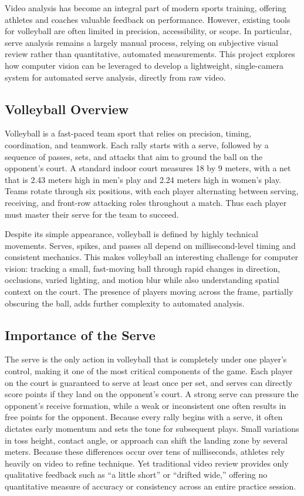Video analysis has become an integral part of modern sports training, offering athletes and coaches valuable feedback on performance. However, existing tools for volleyball are often limited in precision, accessibility, or scope. In particular, serve analysis remains a largely manual process, relying on subjective visual review rather than quantitative, automated measurements. This project explores how computer vision can be leveraged to develop a lightweight, single-camera system for automated serve analysis, directly from raw video.

\subsection{Volleyball Overview}
Volleyball is a fast-paced team sport that relies on precision, timing, coordination, and teamwork. Each rally starts with a serve, followed by a sequence of passes, sets, and attacks that aim to ground the ball on the opponent's court. A standard indoor court measures 18 by 9 meters, with a net that is 2.43 meters high in men's play and 2.24 meters high in women's play. Teams rotate through six positions, with each player alternating between serving, receiving, and front-row attacking roles throughout a match. Thus each player must master their serve for the team to succeed.

Despite its simple appearance, volleyball is defined by highly technical movements. Serves, spikes, and passes all depend on millisecond-level timing and consistent mechanics. This makes volleyball an interesting challenge for computer vision: tracking a small, fast-moving ball through rapid changes in direction, occlusions, varied lighting, and motion blur while also understanding spatial context on the court. The presence of players moving across the frame, partially obscuring the ball, adds further complexity to automated analysis.

\subsection{Importance of the Serve}
The serve is the only action in volleyball that is completely under one player's control, making it one of the most critical components of the game. Each player on the court is guaranteed to serve at least once per set, and serves can directly score points if they land on the opponent's court. A strong serve can pressure the opponent's receive formation, while a weak or inconsistent one often results in free points for the opponent. Because every rally begins with a serve, it often dictates early momentum and sets the tone for subsequent plays. Small variations in toss height, contact angle, or approach can shift the landing zone by several meters. Because these differences occur over tens of milliseconds, athletes rely heavily on video to refine technique. Yet traditional video review provides only qualitative feedback such as “a little short” or “drifted wide,” offering no quantitative measure of accuracy or consistency across an entire practice session.

